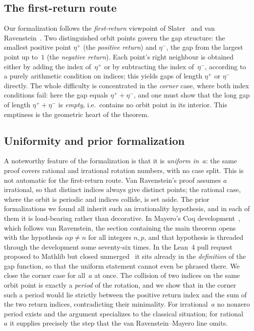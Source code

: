 \documentclass[11pt,reqno]{amsart}
\theoremstyle{plain}
\theoremstyle{definition}
\theoremstyle{remark}
\newcommand{\etap}{\eta^{+}}
\newcommand{\etam}{\eta^{-}}
\begin{document}
\subsection*{The first-return route}
Our formalization follows the \emph{first-return} viewpoint of
Slater~\cite{Slater1967} and van Ravenstein~\cite{vanRavenstein1988}.  Two
distinguished orbit points govern the gap structure: the smallest positive
point $\etap$ (the \emph{positive return}) and $\etam$, the gap from
the largest point up to~$1$ (the \emph{negative return}).  Each point's
right neighbour is obtained either by adding the index of~$\etap$ or by
subtracting the index of~$\etam$, according to a purely arithmetic condition on
indices; this yields gaps of length $\etap$ or $\etam$ directly.  The whole
difficulty is concentrated in the \emph{corner} case, where both index
conditions fail: here the gap equals $\etap+\etam$, and one must show that the
long gap of length $\etap+\etam$ is \emph{empty}, i.e.\ contains no orbit point
in its interior.  This emptiness is the geometric heart of the theorem.

\subsection*{Uniformity and prior formalization}
A noteworthy feature of the formalization is that it is \emph{uniform in~$a$}:
the same proof covers rational and irrational rotation numbers, with no case
split.  This is not automatic for the first-return route.  Van Ravenstein's
proof assumes $a$ irrational, so that distinct indices always give distinct
points; the rational case, where the orbit is periodic and indices collide,
is set aside.  The prior formalizations we found all inherit such an
irrationality hypothesis, and in each of them it is load-bearing rather than
decorative.  In Mayero's Coq development~\cite{Mayero2000,MayeroCoq1998},
which follows van Ravenstein, the section containing the main theorem opens
with the hypothesis $\alpha p \ne n$ for all integers $n,p$, and that
hypothesis is threaded through the development some seventy-six times.  In the
Lean~4 pull request proposed to Mathlib but closed
unmerged~\cite{SaarShai2026} it sits already in the \emph{definition} of the
gap function, so that the uniform statement cannot even be phrased there.  We close
the corner case for all~$a$ at once.  The collision of two indices on the same
orbit point is exactly a \emph{period} of the rotation, and we show that in the
corner such a period would lie strictly between the positive return index and
the sum of the two return indices, contradicting their minimality.  For irrational~$a$ no nonzero period exists and
the argument specializes to the classical situation; for rational~$a$ it
supplies precisely the step that the van Ravenstein--Mayero line omits.
\end{document}
